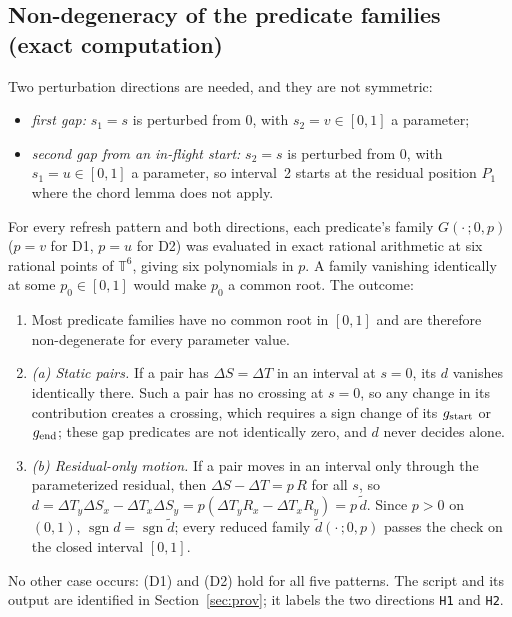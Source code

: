 \documentclass[11pt]{article}
\theoremstyle{remark}\newtheorem{remark}[theorem]{Remark}
\begin{document}
\subsection{Non-degeneracy of the predicate families (exact computation)}
Two perturbation directions are needed, and they are not symmetric:
\begin{itemize}
\item[(D1)] \emph{first gap:} $s_1=s$ is perturbed from $0$, with $s_2=v\in[0,1]$ a parameter;
\item[(D2)] \emph{second gap from an in-flight start:} $s_2=s$ is perturbed from $0$, with $s_1=u\in[0,1]$ a parameter, so interval~2 starts at the residual position $P_1$ where the chord lemma does not apply.
\end{itemize}
For every refresh pattern and both directions, each predicate's family $G(\cdot\,;0,p)$ ($p=v$ for D1, $p=u$ for D2) was evaluated in exact rational arithmetic at six rational points of $\mathbb T^6$, giving six polynomials in $p$. A family vanishing identically at some $p_0\in[0,1]$ would make $p_0$ a common root. The outcome:
\begin{enumerate}
\item Most predicate families have no common root in $[0,1]$ and are therefore non-degenerate for every parameter value.
\item \emph{(a) Static pairs.} If a pair has $\Delta S=\Delta T$ in an interval at $s=0$, its $d$ vanishes identically there. Such a pair has no crossing at $s=0$, so any change in its contribution creates a crossing, which requires a sign change of its $g_{\rm start}$ or $g_{\rm end}$; these gap predicates are not identically zero, and $d$ never decides alone.
\item \emph{(b) Residual-only motion.} If a pair moves in an interval only through the parameterized residual, then $\Delta S-\Delta T=p\,R$ for all $s$, so $d=\Delta T_y\Delta S_x-\Delta T_x\Delta S_y=p(\Delta T_yR_x-\Delta T_xR_y)=p\,\tilde d$. Since $p>0$ on $(0,1)$, $\operatorname{sgn}d=\operatorname{sgn}\tilde d$; every reduced family $\tilde d(\cdot\,;0,p)$ passes the check on the closed interval $[0,1]$.
\end{enumerate}
No other case occurs: (D1) and (D2) hold for all five patterns. The script and its output are identified in Section~\ref{sec:prov}; it labels the two directions \texttt{H1} and \texttt{H2}.
\end{document}
